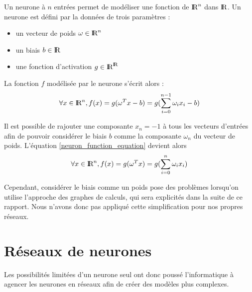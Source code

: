 \begin{definition}[Neurone] 
Un neurone à $n$ entrées permet de modéliser une fonction de $\textrm{I\kern-0.21emR}^n$ dans $\textrm{I\kern-0.21emR}$. Un neurone est défini par la données de trois paramètres :
  \begin{itemize}
    \item un vecteur de poids $\omega \in \textrm{I\kern-0.21emR}^n$
    \item un biais $b \in \textrm{I\kern-0.21emR}$
    \item une fonction d'activation $g \in \textrm{I\kern-0.21emR}^{\textrm{I\kern-0.21emR}}$
  \end{itemize}

La fonction $f$ modélisée par le neurone s'écrit alors : 
  \begin{equation}
\forall x \in \textrm{I\kern-0.21emR}^n, f(x) = g(\omega^{T}x - b) = g(\sum_{i=0}^{n-1}\omega_{i}x_{i} - b)
  \label{neuron_function_equation}
  \end{equation}
\end{definition}    
\begin{remark}[Biais]
Il est possible de rajouter une composante $x_{n} = -1$ à tous les vecteurs d'entrées afin de pouvoir considérer le biais $b$ comme la composante $\omega_n$ du vecteur de poids. L'équation \eqref{neuron_function_equation} devient alors
  \begin{equation}
\forall x \in \textrm{I\kern-0.21emR}^n, f(x) = g(\omega^{T}x) = g(\sum_{i=0}^{n}\omega_{i}x_{i})  
  \label{corrected_neuron_function_equation}
  \end{equation}

Cependant, considérer le biais comme un poids pose des problèmes lorsqu'on utilise l'approche des graphes de calculs, qui sera explicités dans la suite de ce rapport. Nous n'avons donc pas appliqué cette simplification pour nos propres réseaux.

\end{remark}



\section{Réseaux de neurones}

Les possibilités limitées d'un neurone seul ont donc poussé l'informatique à agencer les neurones en réseaux afin de créer des modèles plus complexes. \\

